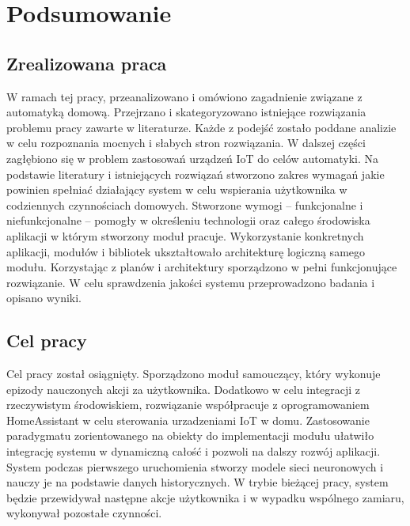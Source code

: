 
\chapter*{Podsumowanie}
\section*{Zrealizowana praca}
W ramach tej pracy, przeanalizowano i omówiono zagadnienie związane z automatyką domową. Przejrzano i skategoryzowano istniejące rozwiązania problemu pracy zawarte w literaturze. Każde z podejść zostało poddane analizie w celu rozpoznania mocnych i słabych stron rozwiązania. W dalszej części zagłębiono się w problem zastosowań urządzeń IoT do celów automatyki. Na podstawie literatury i istniejących rozwiązań stworzono zakres wymagań jakie powinien spełniać działający system w celu wspierania użytkownika w codziennych czynnościach domowych. Stworzone wymogi -- funkcjonalne i niefunkcjonalne -- pomogły w określeniu technologii oraz całego środowiska aplikacji w którym stworzony moduł pracuje. Wykorzystanie konkretnych aplikacji, modułów i bibliotek ukształtowało architekturę logiczną samego modułu. Korzystając z planów i architektury sporządzono w pełni funkcjonujące rozwiązanie. W celu sprawdzenia jakości systemu przeprowadzono badania i opisano wyniki.

\section*{Cel pracy}
Cel pracy został osiągnięty. Sporządzono moduł samouczący, który wykonuje epizody nauczonych akcji za użytkownika. Dodatkowo w celu integracji z rzeczywistym środowiskiem, rozwiązanie współpracuje z oprogramowaniem HomeAssistant w celu sterowania urzadzeniami IoT w domu. Zastosowanie paradygmatu zorientowanego na obiekty do implementacji modułu ułatwiło integrację systemu w dynamiczną całość i pozwoli na dalszy rozwój aplikacji. System podczas pierwszego uruchomienia stworzy modele sieci neuronowych i nauczy je na podstawie danych historycznych. W trybie bieżącej pracy, system będzie przewidywał następne akcje użytkownika i w wypadku wspólnego zamiaru, wykonywał pozostałe czynności.

